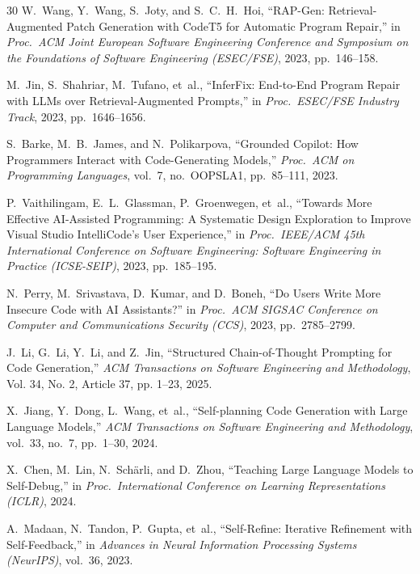\documentclass[conference]{IEEEtran}
\begin{document}
\begin{thebibliography}{30}
W.~Wang, Y.~Wang, S.~Joty, and S.~C.~H.~Hoi,
``RAP-Gen: Retrieval-Augmented Patch Generation with CodeT5 for Automatic Program Repair,''
in \emph{Proc.\ ACM Joint European Software Engineering Conference and Symposium on the Foundations of Software Engineering (ESEC/FSE)}, 2023, pp.~146--158.

M.~Jin, S.~Shahriar, M.~Tufano, et~al.,
``InferFix: End-to-End Program Repair with LLMs over Retrieval-Augmented Prompts,''
in \emph{Proc.\ ESEC/FSE Industry Track}, 2023, pp.~1646--1656.


S.~Barke, M.~B.~James, and N.~Polikarpova,
``Grounded Copilot: How Programmers Interact with Code-Generating Models,''
\emph{Proc.\ ACM on Programming Languages}, vol.~7, no.~OOPSLA1, pp.~85--111, 2023.

P.~Vaithilingam, E.~L.~Glassman, P.~Groenwegen, et~al.,
``Towards More Effective AI-Assisted Programming: A Systematic Design Exploration to Improve Visual Studio IntelliCode's User Experience,''
in \emph{Proc.\ IEEE/ACM 45th International Conference on Software Engineering: Software Engineering in Practice (ICSE-SEIP)}, 2023, pp.~185--195.

N.~Perry, M.~Srivastava, D.~Kumar, and D.~Boneh,
``Do Users Write More Insecure Code with AI Assistants?''
in \emph{Proc.\ ACM SIGSAC Conference on Computer and Communications Security (CCS)}, 2023, pp.~2785--2799.


J.~Li, G.~Li, Y.~Li, and Z.~Jin,
``Structured Chain-of-Thought Prompting for Code Generation,''
\emph{ACM Transactions on Software Engineering and Methodology}, Vol. 34, No. 2, Article 37, pp. 1–23, 2025.

X.~Jiang, Y.~Dong, L.~Wang, et~al.,
``Self-planning Code Generation with Large Language Models,''
\emph{ACM Transactions on Software Engineering and Methodology}, vol.~33, no.~7, pp.~1--30, 2024.

X.~Chen, M.~Lin, N.~Sch{\"a}rli, and D.~Zhou,
``Teaching Large Language Models to Self-Debug,''
in \emph{Proc.\ International Conference on Learning Representations (ICLR)}, 2024.

A.~Madaan, N.~Tandon, P.~Gupta, et~al.,
``Self-Refine: Iterative Refinement with Self-Feedback,''
in \emph{Advances in Neural Information Processing Systems (NeurIPS)}, vol.~36, 2023.


\end{thebibliography}
\end{document}
